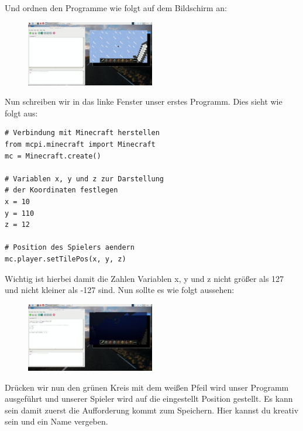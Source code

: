 Und ordnen den Programme wie folgt auf dem Bildschirm an:
\begin{figure}[H]
	\includegraphics[width=0.5\textwidth]{Bilder/Bildschirm_Anordnung.png} %
\end{figure}

Nun schreiben wir in das linke Fenster unser erstes Programm. Dies sieht wie folgt aus:

\lstset{language=Python}
\lstset{frame=lines}
\lstset{basicstyle=\footnotesize}
\begin{lstlisting}
# Verbindung mit Minecraft herstellen
from mcpi.minecraft import Minecraft
mc = Minecraft.create()

# Variablen x, y und z zur Darstellung
# der Koordinaten festlegen 
x = 10
y = 110
z = 12

# Position des Spielers aendern 
mc.player.setTilePos(x, y, z)
\end{lstlisting}


Wichtig ist hierbei damit die Zahlen Variablen x, y und z nicht größer als 127 und nicht kleiner als -127 sind. Nun sollte es wie folgt aussehen:

\begin{figure}[H]
	\includegraphics[width=0.5\textwidth]{Bilder/Erstes_Programm.png} %
\end{figure}
Drücken wir nun den grünen Kreis mit dem weißen Pfeil wird unser Programm ausgeführt und unserer Spieler wird auf die eingestellt Position gestellt. Es kann sein damit zuerst die Aufforderung kommt zum Speichern. Hier kannst du kreativ sein und ein Name vergeben.

